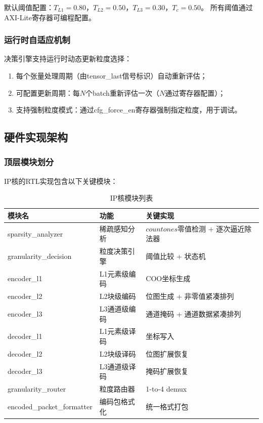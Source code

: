 \documentclass[a4paper,12pt,fontset=ubuntu]{ctexart}
\begin{document}
默认阈值配置：$T_{L1} = 0.80$，$T_{L2} = 0.50$，$T_{L3} = 0.30$，$T_c = 0.50$。
所有阈值通过AXI-Lite寄存器可编程配置。

\subsubsection{运行时自适应机制}

决策引擎支持运行时动态更新粒度选择：

\begin{enumerate}
  \item 每个张量处理周期（由tensor\_last信号标识）自动重新评估；
  \item 可配置更新周期：每$N$个batch重新评估一次（$N$通过寄存器配置）；
  \item 支持强制粒度模式：通过cfg\_force\_en寄存器强制指定粒度，用于调试。
\end{enumerate}

\subsection{硬件实现架构}

\subsubsection{顶层模块划分}

IP核的RTL实现包含以下关键模块：

\begin{table}[htbp]
\centering
\caption{IP核模块列表}
\begin{tabular}{llp{7cm}}
\toprule
\textbf{模块名} & \textbf{功能} & \textbf{关键实现} \\
\midrule
sparsity\_analyzer   & 稀疏感知分析 & $countones$零值检测 + 逐次逼近除法器 \\
granularity\_decision & 粒度决策引擎 & 阈值比较 + 状态机 \\
encoder\_l1          & L1元素级编码 & COO坐标生成 \\
encoder\_l2          & L2块级编码 & 位图生成 + 非零值紧凑排列 \\
encoder\_l3          & L3通道级编码 & 通道掩码 + 通道数据紧凑排列 \\
decoder\_l1          & L1元素级译码 & 坐标写入 \\
decoder\_l2          & L2块级译码 & 位图扩展恢复 \\
decoder\_l3          & L3通道级译码 & 掩码扩展恢复 \\
granularity\_router  & 粒度路由器 & 1-to-4 demux \\
encoded\_packet\_formatter & 编码包格式化 & 统一格式打包 \\
\bottomrule
\end{tabular}
\end{table}
\end{document}
